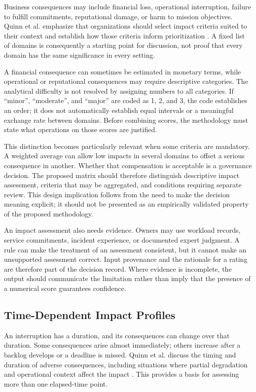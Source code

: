 Business consequences may include financial loss, operational interruption, failure to fulfill commitments, reputational damage, or harm to mission objectives. Quinn et al. emphasize that organizations should select impact criteria suited to their context and establish how those criteria inform prioritization \cite{quinn2025bia}. A fixed list of domains is consequently a starting point for discussion, not proof that every domain has the same significance in every setting.

A financial consequence can sometimes be estimated in monetary terms, while operational or reputational consequences may require descriptive categories. The analytical difficulty is not resolved by assigning numbers to all categories. If ``minor'', ``moderate'', and ``major'' are coded as 1, 2, and 3, the code establishes an order; it does not automatically establish equal intervals or a meaningful exchange rate between domains. Before combining scores, the methodology must state what operations on those scores are justified.

This distinction becomes particularly relevant when some criteria are mandatory. A weighted average can allow low impacts in several domains to offset a serious consequence in another. Whether that compensation is acceptable is a governance decision. The proposed matrix should therefore distinguish descriptive impact assessment, criteria that may be aggregated, and conditions requiring separate review. This design implication follows from the need to make the decision meaning explicit; it should not be presented as an empirically validated property of the proposed methodology.

An impact assessment also needs evidence. Owners may use workload records, service commitments, incident experience, or documented expert judgment. A rule can make the treatment of an assessment consistent, but it cannot make an unsupported assessment correct. Input provenance and the rationale for a rating are therefore part of the decision record. Where evidence is incomplete, the output should communicate the limitation rather than imply that the presence of a numerical score guarantees confidence.

\subsection{Time-Dependent Impact Profiles}

An interruption has a duration, and its consequences can change over that duration. Some consequences arise almost immediately; others increase after a backlog develops or a deadline is missed. Quinn et al. discuss the timing and duration of adverse consequences, including situations where partial degradation and operational context affect the impact \cite{quinn2025bia}. This provides a basis for assessing more than one elapsed-time point.

